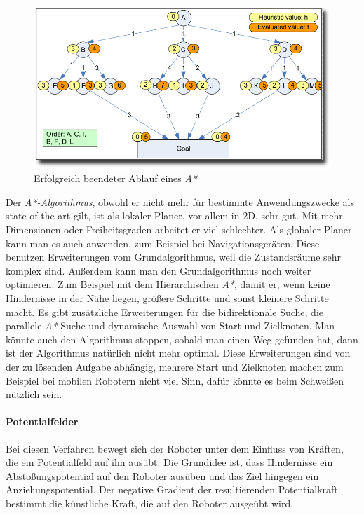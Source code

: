 \begin{figure}[h]
\center
\includegraphics[scale=0.3]{graphics/AStar.png}
\caption{\label{fig:a*} Erfolgreich beendeter Ablauf eines \textit{A*}  \citep{innoKonz}}
\end{figure}

Der \textit{A*-Algorithmus}, obwohl er nicht mehr für bestimmte Anwendungszwecke als state-of-the-art gilt\citep{innoKonz}, ist als lokaler Planer, vor allem in 2D, sehr gut.
Mit mehr Dimensionen oder Freiheitsgraden arbeitet er viel schlechter. Als globaler Planer kann man es auch anwenden, zum Beispiel bei Navigationsgeräten. Diese benutzen Erweiterungen vom Grundalgorithmus, weil die Zustandsräume sehr komplex sind. 
Außerdem kann man den Grundalgorithmus noch weiter optimieren.
Zum Beispiel mit dem Hierarchischen \textit{A*}, damit er, wenn keine Hindernisse in der Nähe liegen, größere Schritte und sonst kleinere Schritte macht.
Es gibt zusätzliche Erweiterungen für die bidirektionale Suche, die parallele \textit{A*}-Suche und dynamische Auswahl von Start und Zielknoten.
Man könnte auch den Algorithmus stoppen, sobald man einen Weg gefunden hat, dann ist der Algorithmus natürlich nicht mehr optimal.
Diese Erweiterungen sind von der zu lösenden Aufgabe abhängig, mehrere Start und Zielknoten machen zum Beispiel bei mobilen Robotern nicht viel Sinn, dafür könnte es beim Schweißen nützlich sein.

\paragraph{Potentialfelder}

Bei diesen Verfahren bewegt sich der Roboter unter dem Einfluss von Kräften, die ein Potentialfeld auf ihn ausübt.
Die Grundidee ist, dass Hindernisse ein Abstoßungspotential auf den Roboter ausüben und das Ziel hingegen ein Anziehungspotential.
Der negative Gradient der resultierenden Potentialkraft bestimmt die künstliche Kraft, die auf den Roboter ausgeübt wird.

